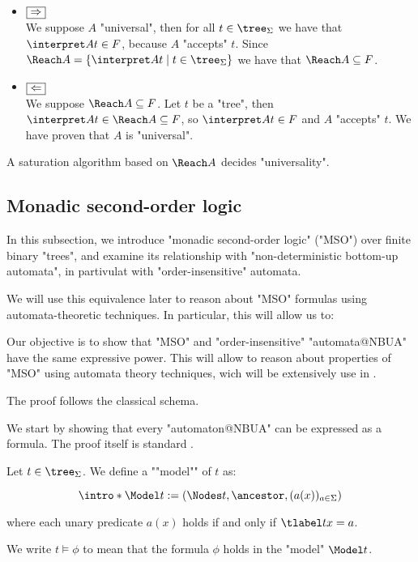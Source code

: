 \documentclass[a4paper,UKenglish,cleveref, autoref, thm-restate]{lipics-v2021}
\begin{document}
\begin{proofI}
	\begin{itemize}
		\item $\fbox{$\Rightarrow$}$\\
		      We suppose $A$ "universal", then for all $t \in \tree_\Sigma$ we have that $\interpret A t \in F$, because $A$ "accepts" $t$.
		      Since $\Reach A = \setdef {\interpret A t} {t\in \tree_\Sigma}$ we have that $\Reach A \subseteq F$.

		\item $\fbox{$\Leftarrow$}$\\
		      We suppose $\Reach A \subseteq F$. Let $t$ be a "tree", then $\interpret A t \in \Reach A \subseteq F$, so $\interpret A t \in F$ and $A$
		      "accepts" $t$. We have proven that $A$ is "universal".
	\end{itemize}
\end{proofI}


\begin{coro}\label{coro:univeral-Reach}
	A saturation algorithm based on $\Reach A$ decides "universality".
\end{coro}


\subsection{Monadic second-order logic}\label{sec:MSO}

In this subsection, we introduce "monadic second-order logic" ("MSO") over finite binary "trees",
and examine its relationship with "non-deterministic bottom-up automata", in partivulat with "order-insensitive" automata.

We will use this equivalence later to reason about "MSO" formulas using automata-theoretic techniques. In particular, this will allow us to:

Our objective is to show that "MSO" and "order-insensitive" "automata@NBUA" have the same expressive power. This will allow to reason about
properties of "MSO" using automata theory techniques, wich will be extensively use in .

The proof follows the classical schema.

We start by showing that every "automaton@NBUA" can be expressed as a formula. The proof itself is standard \cite{Buchi60, Thomas1997, bookautomata}.

\begin{definition}
	\AP Let $t \in \tree_{\Sigma}$. We define a ""model"" of $t$ as:

	\[
		\intro* \Model t := (\Nodes t, \ancestor , (a (x))_{a \in \Sigma})
	\]

	where each unary predicate $a(x)$ holds if and only if $\tlabel t x = a$.

	We write $t \models \phi$ to mean that the formula $\phi$ holds in the "model" $\Model t$.
\end{definition}
\end{document}
